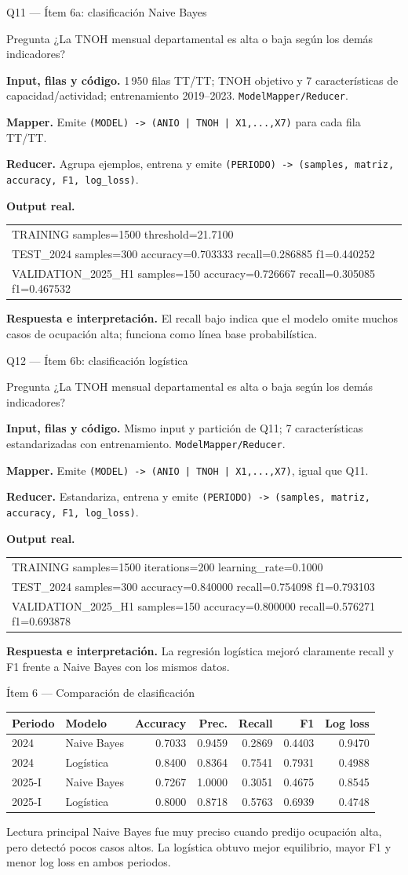 \documentclass{beamer}
\newcommand{\queryframe}[7]{%
\begin{frame}{#1}
\scriptsize
\begin{alertblock}{Pregunta}
#2
\end{alertblock}
\textbf{Input, filas y código.} #3

\vspace{0.45em}
\textbf{Mapper.} #4

\vspace{0.45em}
\textbf{Reducer.} #5

\vspace{0.45em}
\textbf{Output real.} {\ttfamily\tiny #6}

\vspace{0.45em}
\textbf{Respuesta e interpretación.} #7
\end{frame}
}
\begin{document}
\queryframe{Q11 — Ítem 6a: clasificación Naive Bayes}
{¿La TNOH mensual departamental es alta o baja según los demás indicadores?}
{1\,950 filas TT/TT; TNOH objetivo y 7 características de capacidad/actividad; entrenamiento 2019--2023. \texttt{ModelMapper/Reducer}.}
{Emite \texttt{(MODEL) -> (ANIO | TNOH | X1,...,X7)} para cada fila TT/TT.}
{Agrupa ejemplos, entrena y emite \texttt{(PERIODO) -> (samples, matriz, accuracy, F1, log\_loss)}.}
{\begin{tabular}{@{}l@{}}
TRAINING samples=1500 threshold=21.7100 \\
TEST\_2024 samples=300 accuracy=0.703333 recall=0.286885 f1=0.440252 \\
VALIDATION\_2025\_H1 samples=150 accuracy=0.726667 recall=0.305085 f1=0.467532
\end{tabular}}
{El recall bajo indica que el modelo omite muchos casos de ocupación alta; funciona como línea base probabilística.}

\queryframe{Q12 — Ítem 6b: clasificación logística}
{¿La TNOH mensual departamental es alta o baja según los demás indicadores?}
{Mismo input y partición de Q11; 7 características estandarizadas con entrenamiento. \texttt{ModelMapper/Reducer}.}
{Emite \texttt{(MODEL) -> (ANIO | TNOH | X1,...,X7)}, igual que Q11.}
{Estandariza, entrena y emite \texttt{(PERIODO) -> (samples, matriz, accuracy, F1, log\_loss)}.}
{\begin{tabular}{@{}l@{}}
TRAINING samples=1500 iterations=200 learning\_rate=0.1000 \\
TEST\_2024 samples=300 accuracy=0.840000 recall=0.754098 f1=0.793103 \\
VALIDATION\_2025\_H1 samples=150 accuracy=0.800000 recall=0.576271 f1=0.693878
\end{tabular}}
{La regresión logística mejoró claramente recall y F1 frente a Naive Bayes con los mismos datos.}

\begin{frame}{Ítem 6 — Comparación de clasificación}
\scriptsize
\begin{table}
\centering
\begin{tabular}{llrrrrr}
\toprule
\textbf{Periodo} & \textbf{Modelo} & \textbf{Accuracy} & \textbf{Prec.} & \textbf{Recall} & \textbf{F1} & \textbf{Log loss} \\
\midrule
2024 & Naive Bayes & 0.7033 & 0.9459 & 0.2869 & 0.4403 & 0.9470 \\
2024 & Logística & 0.8400 & 0.8364 & 0.7541 & 0.7931 & 0.4988 \\
2025-I & Naive Bayes & 0.7267 & 1.0000 & 0.3051 & 0.4675 & 0.8545 \\
2025-I & Logística & 0.8000 & 0.8718 & 0.5763 & 0.6939 & 0.4748 \\
\bottomrule
\end{tabular}
\end{table}

\begin{alertblock}{Lectura principal}
Naive Bayes fue muy preciso cuando predijo ocupación alta, pero detectó pocos casos altos. La logística obtuvo mejor equilibrio, mayor F1 y menor log loss en ambos periodos.
\end{alertblock}
\end{frame}
\end{document}
